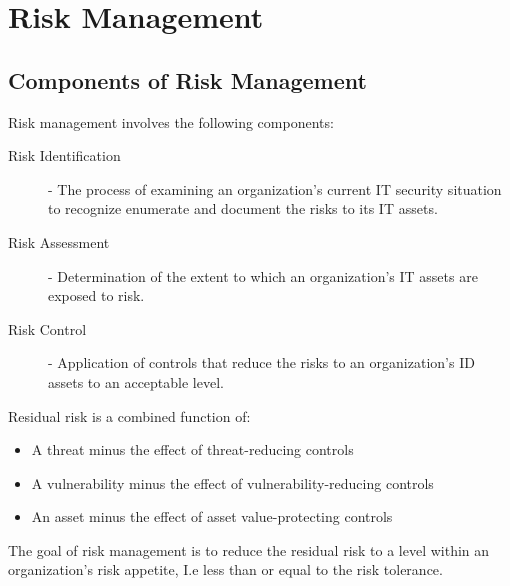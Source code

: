 \documentclass[12pt letter]{report}
\begin{document}
\chapter{Risk Management}



\section{Components of Risk Management}
Risk management involves the following components:
\begin{description}
  \item[Risk Identification]  - The process of examining an
    organization's current IT security situation to recognize
    enumerate and document the risks to its IT assets.
  \item[Risk Assessment] - Determination of the extent to which an
    organization's IT assets are exposed to risk.
  \item[Risk Control] - Application of controls that reduce the risks
    to an organization's ID assets to an acceptable level.
\end{description}



Residual risk is a combined function of:
\begin{itemize}
  \item A threat minus the effect of threat-reducing controls
  \item A vulnerability minus the effect of vulnerability-reducing controls
  \item An asset minus the effect of asset value-protecting controls
\end{itemize}

The goal of risk management is to reduce the residual risk to a level
within an organization's risk appetite, I.e less than or equal to the
risk tolerance.
\end{document}
